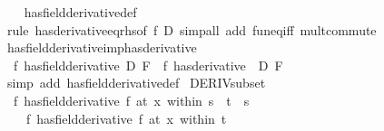 \begin{isabellebody}
%
\isadelimproof
\ \ %
\endisadelimproof
%
\isatagproof
{}\isamarkupfalse%
\ has{\isacharunderscore}{\kern0pt}field{\isacharunderscore}{\kern0pt}derivative{\isacharunderscore}{\kern0pt}def\isanewline
\ \ \isamarkupfalse%
\ {\isacharparenleft}{\kern0pt}rule\ has{\isacharunderscore}{\kern0pt}derivative{\isacharunderscore}{\kern0pt}eq{\isacharunderscore}{\kern0pt}rhs{\isacharbrackleft}{\kern0pt}of\ f\ D{\isacharbrackright}{\kern0pt}{\isacharparenright}{\kern0pt}\ {\isacharparenleft}{\kern0pt}simp{\isacharunderscore}{\kern0pt}all\ add{\isacharcolon}{\kern0pt}\ fun{\isacharunderscore}{\kern0pt}eq{\isacharunderscore}{\kern0pt}iff\ mult{\isachardot}{\kern0pt}commute{\isacharparenright}{\kern0pt}%
\endisatagproof
{\isafoldproof}%
%
\isadelimproof
\isanewline
%
\endisadelimproof
\isanewline
{}\isamarkupfalse%
\ has{\isacharunderscore}{\kern0pt}field{\isacharunderscore}{\kern0pt}derivative{\isacharunderscore}{\kern0pt}imp{\isacharunderscore}{\kern0pt}has{\isacharunderscore}{\kern0pt}derivative{\isacharcolon}{\kern0pt}\isanewline
\ \ {\isachardoublequoteopen}{\isacharparenleft}{\kern0pt}f\ has{\isacharunderscore}{\kern0pt}field{\isacharunderscore}{\kern0pt}derivative\ D{\isacharparenright}{\kern0pt}\ F\ {\isasymLongrightarrow}\ {\isacharparenleft}{\kern0pt}f\ has{\isacharunderscore}{\kern0pt}derivative\ {\isacharparenleft}{\kern0pt}{\isacharasterisk}{\kern0pt}{\isacharparenright}{\kern0pt}\ D{\isacharparenright}{\kern0pt}\ F{\isachardoublequoteclose}\isanewline
%
\isadelimproof
\ \ %
\endisadelimproof
%
\isatagproof
{}\isamarkupfalse%
\ {\isacharparenleft}{\kern0pt}simp\ add{\isacharcolon}{\kern0pt}\ has{\isacharunderscore}{\kern0pt}field{\isacharunderscore}{\kern0pt}derivative{\isacharunderscore}{\kern0pt}def{\isacharparenright}{\kern0pt}%
\endisatagproof
{\isafoldproof}%
%
\isadelimproof
\isanewline
%
\endisadelimproof
\isanewline
{}\isamarkupfalse%
\ DERIV{\isacharunderscore}{\kern0pt}subset{\isacharcolon}{\kern0pt}\isanewline
\ \ {\isachardoublequoteopen}{\isacharparenleft}{\kern0pt}f\ has{\isacharunderscore}{\kern0pt}field{\isacharunderscore}{\kern0pt}derivative\ f{\isacharprime}{\kern0pt}{\isacharparenright}{\kern0pt}\ {\isacharparenleft}{\kern0pt}at\ x\ within\ s{\isacharparenright}{\kern0pt}\ {\isasymLongrightarrow}\ t\ {\isasymsubseteq}\ s\ {\isasymLongrightarrow}\isanewline
\ \ \ \ {\isacharparenleft}{\kern0pt}f\ has{\isacharunderscore}{\kern0pt}field{\isacharunderscore}{\kern0pt}derivative\ f{\isacharprime}{\kern0pt}{\isacharparenright}{\kern0pt}\ {\isacharparenleft}{\kern0pt}at\ x\ within\ t{\isacharparenright}{\kern0pt}{\isachardoublequoteclose}\isanewline

\end{isabellebody}
